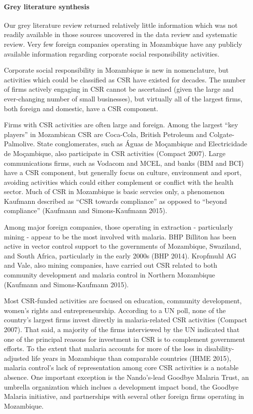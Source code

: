 \documentclass[]{article}
\let\oldparagraph\paragraph
\renewcommand{\paragraph}[1]{\oldparagraph{#1}\mbox{}}
\begin{document}
\paragraph{Grey literature synthesis}\label{grey-literature-synthesis}

Our grey literature review returned relatively little information which
was not readily available in those sources uncovered in the data review
and systematic review. Very few foreign companies operating in
Mozambique have any publicly available information regarding corporate
social responsibility activities.

Corporate social responsibility in Mozambique is new in nomenclature,
but activities which could be classified as CSR have existed for
decades. The number of firms actively engaging in CSR cannot be
ascertained (given the large and ever-changing number of small
businesses), but virtually all of the largest firms, both foreign and
domestic, have a CSR component.

Firms with CSR activities are often large and foreign. Among the largest
``key players'' in Mozambican CSR are Coca-Cola, British Petroleum and
Colgate-Palmolive. State conglomerates, such as Águas de Moçambique and
Electricidade de Moçambique, also participate in CSR activities (Compact
2007). Large communications firms, such as Vodacom and MCEL, and banks
(BIM and BCI) have a CSR component, but generally focus on culture,
environment and sport, avoiding activities which could either complement
or conflict with the health sector. Much of CSR in Mozambique is basic
servcies only, a phenomenon Kaufmann described as ``CSR towards
compliance'' as opposed to ``beyond compliance'' (Kaufmann and
Simons-Kaufmann 2015).

Among major foreign companies, those operating in extraction -
particularly mining - appear to be the most involved with malaria. BHP
Billiton has been active in vector control support to the governments of
Mozambique, Swaziland, and South Africa, particularly in the early 2000s
(BHP 2014). Kropfmuhl AG and Vale, also mining companies, have carried
out CSR related to both community development and malaria control in
Northern Mozambique (Kaufmann and Simons-Kaufmann 2015).

Most CSR-funded activities are focused on education, community
development, women's rights and entrepreneurship. According to a UN
poll, none of the country's largest firms invest directly in
malaria-related CSR activities (Compact 2007). That said, a majority of
the firms interviewed by the UN indicated that one of the principal
reasons for investment in CSR is to complement government efforts. To
the extent that malaria accounts for more of the loss in
disability-adjusted life years in Mozambique than comparable countries
(IHME 2015), malaria control's lack of representation among core CSR
activities is a notable absence. One important exception is the
Nando's-lead Goodbye Malaria Trust, an umbrella organization which
inclues a development impact bond, the Goodbye Malaria initiative, and
partnerships with several other foreign firms operating in Mozambique.
\end{document}
